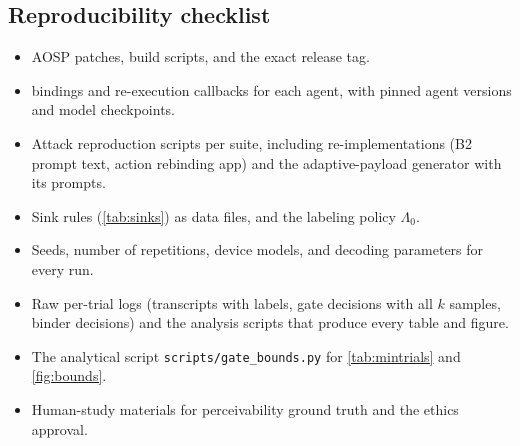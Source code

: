 \subsection{Reproducibility checklist}\label{sec:repro}

\begin{itemize}
  \item AOSP patches, build scripts, and the exact release tag. 
  \item \PA{} bindings and re-execution callbacks for each agent, with pinned agent versions and model checkpoints.
  \item Attack reproduction scripts per suite, including re-implementations (B2 prompt text, action rebinding app) and the adaptive-payload generator with its prompts.
  \item Sink rules (\cref{tab:sinks}) as data files, and the labeling policy $\Lambda_0$.
  \item Seeds, number of repetitions, device models, and decoding parameters for every run.
  \item Raw per-trial logs (transcripts with labels, gate decisions with all $k$ samples, binder decisions) and the analysis scripts that produce every table and figure.
  \item The analytical script \texttt{scripts/gate\_bounds.py} for \cref{tab:mintrials} and \cref{fig:bounds}.
  \item Human-study materials for perceivability ground truth and the ethics approval. 
\end{itemize}
